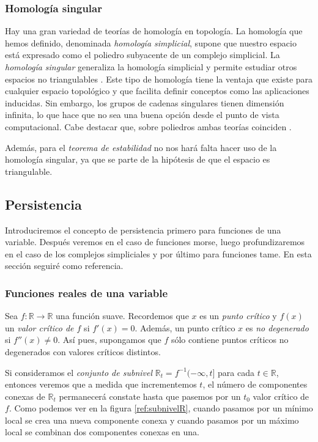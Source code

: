 \subsubsection*{Homología singular}
Hay una gran variedad de teorías de homología en topología. La homología que hemos definido, denominada \emph{homología simplicial}, supone que nuestro espacio está expresado como el poliedro subyacente de un complejo simplicial. La \emph{homología singular} generaliza la homología simplicial y permite estudiar otros espacios no triangulables \cite{Crossley_2005}. Este tipo de homología tiene la ventaja que existe para cualquier espacio topológico y que facilita definir conceptos como las aplicaciones inducidas. Sin embargo, los grupos de cadenas singulares tienen dimensión infinita, lo que hace que no sea una buena opción desde el punto de vista computacional. Cabe destacar que, sobre poliedros ambas teorías coinciden \cite{articuloPersistenciaEH}.

Además, para el \textit{teorema de estabilidad} no nos hará falta hacer uso de la homología singular, ya que se parte de la hipótesis de que el espacio es triangulable.

\subsection{Persistencia}
Introduciremos el concepto de persistencia primero para funciones de una variable. Después veremos en el caso de funciones morse, luego profundizaremos en el caso de los complejos simpliciales y por último para funciones tame. En esta sección seguiré \cite{articuloPersistenciaEH} como referencia.

\subsubsection*{Funciones reales de una variable}
Sea $f: \mathbb{R} \to \mathbb{R}$ una función suave. Recordemos que $x$ es un \emph{punto crítico} y $f(x)$ un \emph{valor crítico de $f$} si $f'(x)=0$. Además, un punto crítico $x$ es \emph{no degenerado} si $f''(x) \neq 0$. Así pues, supongamos que $f$ sólo contiene puntos críticos no degenerados con valores críticos distintos.

Si consideramos el \emph{conjunto de subnivel} $\mathbb{R}_t=f^{-1}(-\infty, t]$ para cada $t \in \mathbb{R}$, entonces veremos que a medida que incrementemos $t$, el número de componentes conexas de $\mathbb{R}_t$ permanecerá constate hasta que pasemos por un $t_0$ valor crítico de $f$. Como podemos ver en la figura \ref{ref:subnivelR}, cuando pasamos por un mínimo local se crea una nueva componente conexa y cuando pasamos por un máximo local se combinan dos componentes conexas en una.

